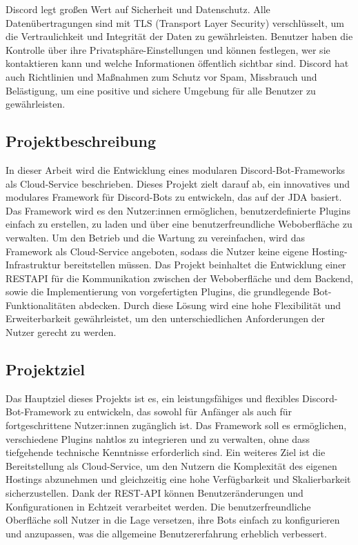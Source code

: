 Discord legt großen Wert auf Sicherheit und Datenschutz. Alle Datenübertragungen sind mit TLS (Transport Layer Security) verschlüsselt, um die Vertraulichkeit und Integrität der Daten zu gewährleisten. Benutzer haben die Kontrolle über ihre Privatsphäre-Einstellungen und können festlegen, wer sie kontaktieren kann und welche Informationen öffentlich sichtbar sind. Discord hat auch Richtlinien und Maßnahmen zum Schutz vor Spam, Missbrauch und Belästigung, um eine positive und sichere Umgebung für alle Benutzer zu gewährleisten.\autocite{discord-privacy}

\subsection{Projektbeschreibung}\label{projektbeschreibung}

In dieser Arbeit wird die Entwicklung eines modularen Discord-Bot-Frameworks als Cloud-Service beschrieben. Dieses Projekt zielt darauf ab, ein innovatives und modulares Framework für Discord-Bots zu entwickeln, das auf der \gls{JDA} \autocite{jda-github,jda-wiki} basiert. Das Framework wird es den Nutzer:innen ermöglichen, benutzerdefinierte Plugins einfach zu erstellen, zu laden und über eine benutzerfreundliche Weboberfläche zu verwalten. Um den Betrieb und die Wartung zu vereinfachen, wird das Framework als Cloud-Service angeboten, sodass die Nutzer keine eigene Hosting-Infrastruktur bereitstellen müssen. Das Projekt beinhaltet die Entwicklung einer \gls{RESTAPI} für die Kommunikation zwischen der Weboberfläche und dem Backend, sowie die Implementierung von vorgefertigten Plugins, die grundlegende Bot-Funktionalitäten abdecken. Durch diese Lösung wird eine hohe Flexibilität und Erweiterbarkeit gewährleistet, um den unterschiedlichen Anforderungen der Nutzer gerecht zu werden.

\subsection{Projektziel}\label{projektziel}

Das Hauptziel dieses Projekts ist es, ein leistungsfähiges und flexibles Discord-Bot-Framework zu entwickeln, das sowohl für Anfänger als auch für fortgeschrittene Nutzer:innen zugänglich ist. Das Framework soll es ermöglichen, verschiedene Plugins nahtlos zu integrieren und zu verwalten, ohne dass tiefgehende technische Kenntnisse erforderlich sind. Ein weiteres Ziel ist die Bereitstellung als Cloud-Service, um den Nutzern die Komplexität des eigenen Hostings abzunehmen und gleichzeitig eine hohe Verfügbarkeit und Skalierbarkeit sicherzustellen. Dank der REST-API können Benutzeränderungen und Konfigurationen in Echtzeit verarbeitet werden. Die benutzerfreundliche Oberfläche soll Nutzer in die Lage versetzen, ihre Bots einfach zu konfigurieren und anzupassen, was die allgemeine Benutzererfahrung erheblich verbessert.